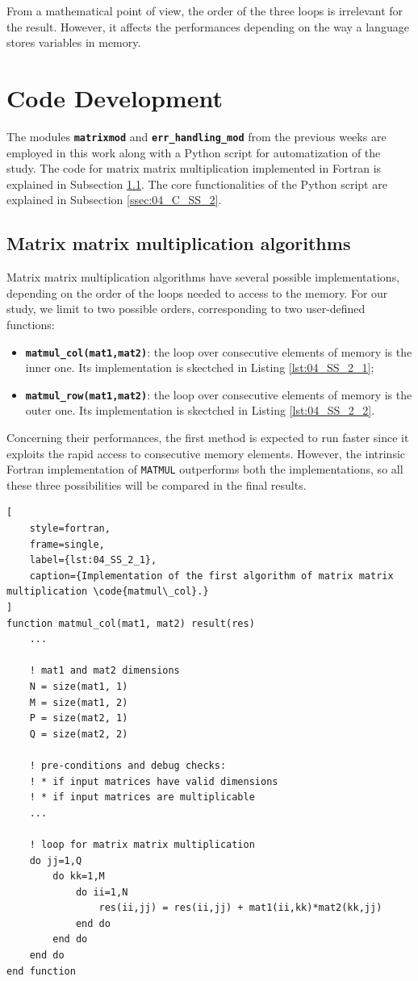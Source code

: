 \documentclass[pra, onecolumn, notitlepage, floats, 11pt]{revtex4-1}
\newcommand{\codebold}[2][cobalt]{\texttt{\bfseries {\color{#1}#2}}}
\newcommand{\code}[2][black]{\color{#1}\texttt{#2}}
\newcommand{\codefunctionbold}[2]{\texttt{\bfseries {\color{cobalt}#1}({\color{lava}#2})}}
\begin{document}
From a mathematical point of view, the order of the three loops is irrelevant for the result. However, it affects the performances depending on the way a language stores variables in memory.





\section{Code Development}
The modules \codebold{matrixmod} and \codebold{err\_handling\_mod} from the previous weeks are employed in this work along with a Python script for automatization of the study. The code for matrix matrix multiplication implemented in Fortran is explained in Subsection \ref{ssec:04_C_SS_1}. The core functionalities of the Python script are explained in Subsection \ref{ssec:04_C_SS_2}.





\subsection{Matrix matrix multiplication algorithms}
\label{ssec:04_C_SS_1}
Matrix matrix multiplication algorithms have several possible implementations, depending on the order of the loops needed to access to the memory. For our study, we limit to two possible orders, corresponding to two user-defined functions:
\begin{itemize}
    \item \codefunctionbold{matmul\_col}{mat1,mat2}: the loop over consecutive elements of memory is the inner one. Its implementation is skectched in Listing \ref{lst:04_SS_2_1};
    \item \codefunctionbold{matmul\_row}{mat1,mat2}: the loop over consecutive elements of memory is the outer one. Its implementation is skectched in Listing \ref{lst:04_SS_2_2}.
\end{itemize}
Concerning their performances, the first method is expected to run faster since it exploits the rapid access to consecutive memory elements. However, the intrinsic Fortran implementation of \code{MATMUL} outperforms both the implementations, so all these three possibilities will be compared in the final results.

\medskip
\begin{lstlisting}[
    style=fortran,
    frame=single,
    label={lst:04_SS_2_1},
    caption={Implementation of the first algorithm of matrix matrix multiplication \code{matmul\_col}.}
]
function matmul_col(mat1, mat2) result(res)
    ...

    ! mat1 and mat2 dimensions
    N = size(mat1, 1)
    M = size(mat1, 2)
    P = size(mat2, 1)
    Q = size(mat2, 2)

    ! pre-conditions and debug checks:
    ! * if input matrices have valid dimensions
    ! * if input matrices are multiplicable
    ...

    ! loop for matrix matrix multiplication
    do jj=1,Q
        do kk=1,M
            do ii=1,N
                res(ii,jj) = res(ii,jj) + mat1(ii,kk)*mat2(kk,jj)
            end do
        end do
    end do
end function
\end{lstlisting}
\end{document}
